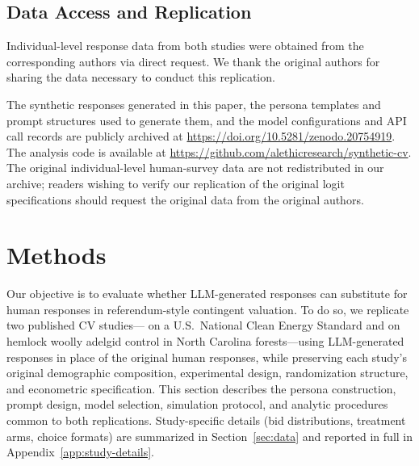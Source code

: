 \documentclass[12pt]{article}
\begin{document}
\subsection{Data Access and Replication}\label{sec:data-access}

Individual-level response data from both studies were obtained from the corresponding authors via direct request. We thank the original authors for sharing the
data necessary to conduct this replication.

The synthetic responses generated in this paper, the persona templates and prompt structures used to generate them, and the model configurations and API call records are publicly archived at \url{https://doi.org/10.5281/zenodo.20754919}.
The analysis code is available at \url{https://github.com/alethicresearch/synthetic-cv}. The original individual-level human-survey data are not redistributed in our archive;
readers wishing to verify our replication of the original logit specifications should request the original data from the original authors.


%

\section{Methods}\label{sec:methods}

Our objective is to evaluate whether LLM-generated responses can substitute
for human responses in referendum-style contingent valuation. To do so, we
replicate two published CV studies---\textcite{Aldy2012} on a U.S.\ National
Clean Energy Standard and \textcite{Giguere2020} on hemlock woolly adelgid
control in North Carolina forests---using LLM-generated responses in place
of the original human responses, while preserving each study's original
demographic composition, experimental design, randomization structure, and
econometric specification. This section describes the persona construction,
prompt design, model selection, simulation protocol, and analytic procedures
common to both replications. Study-specific details (bid distributions,
treatment arms, choice formats) are summarized in Section~\ref{sec:data}
and reported in full in Appendix~\ref{app:study-details}.
\end{document}
